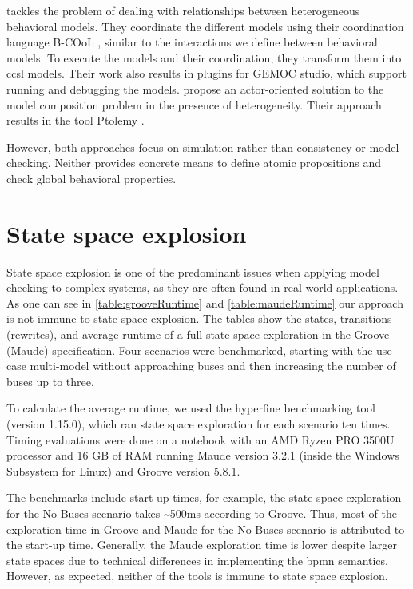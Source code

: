 \documentclass{jot}
\begin{document}
\cite{deantoniModelingBehavioralSemantics2016} tackles the problem of dealing with relationships between heterogeneous behavioral models.
They coordinate the different models using their coordination language B-COoL \cite{varalarsenBCoolBehavioralCoordination2016}, similar to the interactions we define between behavioral models.
To execute the models and their coordination, they transform them into \gls*{ccsl} models.  
Their work also results in plugins for GEMOC studio, which support running and debugging the models.
\cite{ekerTamingHeterogeneityPtolemy2003, leeDisciplinedHeterogeneousModeling2010} propose an actor-oriented solution to the model composition problem in the presence of heterogeneity.
Their approach results in the tool Ptolemy \cite{ptolemaeusSystemDesignModeling2014}.

However, both approaches focus on simulation rather than consistency or model-checking.
Neither provides concrete means to define atomic propositions and check global behavioral properties.


\section{State space explosion} \label{sec:state_space_explosion}
State space explosion is one of the predominant issues when applying model checking to complex systems, as they are often found in real-world applications.
As one can see in \cref{table:grooveRuntime} and \cref{table:maudeRuntime} our approach is not immune to state space explosion.
The tables show the states, transitions (rewrites), and average runtime of a full state space exploration in the Groove (Maude) specification.
Four scenarios were benchmarked, starting with the use case multi-model without approaching buses and then increasing the number of buses up to three.

To calculate the average runtime, we used the hyperfine benchmarking tool \cite{peterHyperfine2022} (version 1.15.0), which ran state space exploration for each scenario ten times.
Timing evaluations were done on a notebook with an AMD Ryzen PRO 3500U processor and 16 GB of RAM running Maude version 3.2.1 (inside the Windows Subsystem for Linux) and Groove version 5.8.1.

The benchmarks include start-up times, for example, the state space exploration for the \textsf{No Buses} scenario takes \textasciitilde 500ms according to Groove.
Thus, most of the exploration time in Groove and Maude for the \textsf{No Buses} scenario is attributed to the start-up time.
Generally, the Maude exploration time is lower despite larger state spaces due to technical differences in implementing the \gls*{bpmn} semantics.
However, as expected, neither of the tools is immune to state space explosion.
\end{document}
